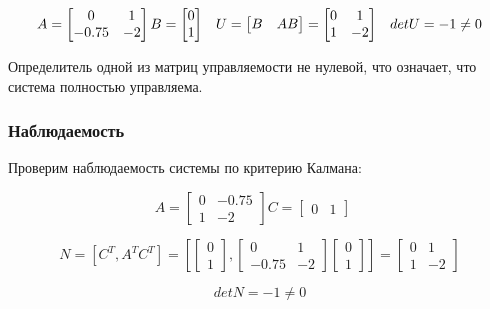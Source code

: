 \begin{equation*}
\text{$A=\begin{bmatrix}
0 & 1 \\ -0.75 & -2
\end{bmatrix} B=\begin{bmatrix}
0 \\ 1
\end{bmatrix}$} \quad
\text{$
U = \begin{bmatrix}
B & AB
\end{bmatrix} = \begin{bmatrix}
0 & 1\\ 1 & -2
\end{bmatrix} 
$} \quad
\text{$detU=-1\neq 0$}
\end{equation*}

Определитель одной из матриц управляемости не нулевой, что означает, что система полностью управляема.

\subsubsection{Наблюдаемость}

Проверим наблюдаемость системы по критерию Калмана:

\begin{equation*}
\text{$A=\begin{bmatrix}
0 & -0.75 \\ 1 & -2
\end{bmatrix} C=\begin{bmatrix}
0 & 1
\end{bmatrix}$} \quad
\end{equation*}

\begin{equation*}
\text{$N=[C^T,A^TC^T]=[\begin{bmatrix} 0 \\ 1 \end{bmatrix},\begin{bmatrix}   0  &  1 \\
   -0.75 &  -2 \end{bmatrix}\begin{bmatrix} 0 \\ 1 \end{bmatrix}]=\begin{bmatrix} 0 & 1 \\ 1 & -2 \end{bmatrix}$}
\end{equation*}

\begin{equation*}
\text{$detN=-1\neq 0$}
\end{equation*}

